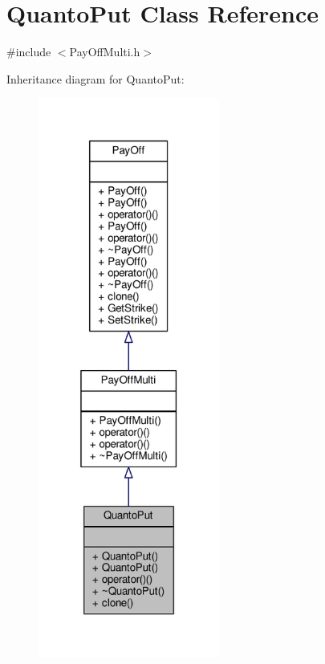 \hypertarget{classQuantoPut}{}\section{Quanto\+Put Class Reference}
\label{classQuantoPut}


{\ttfamily \#include $<$Pay\+Off\+Multi.\+h$>$}



Inheritance diagram for Quanto\+Put\+:
\nopagebreak
\begin{figure}[H]
\begin{center}
\leavevmode
\includegraphics[width=169pt]{classQuantoPut__inherit__graph}
\end{center}
\end{figure}


